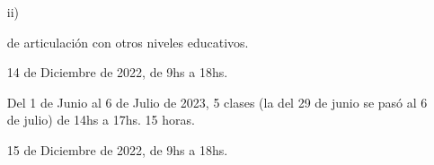 \begin{enumerate}[leftmargin=0.8cm]
{\begin{itemize}[leftmargin=0.2cm]
{\begin{itemize}[leftmargin=0.2cm]
          {}{28, 29 y 30 de Junio de 2016, los tres días durante toda la jornada.}

          {}{16, 17 y 18 de Junio de 2015, los tres días durante toda la jornada.}

          {}{17, 18 y 19 de Junio de 2014, los tres días durante toda la jornada.}

        \end{itemize}

      }

      \item[ii)]{de articulación con otros niveles educativos.

        \begin{itemize}[leftmargin=0.2cm]

          {}{14 de Diciembre de 2022, de 9hs a 18hs.}

          {}{Del 1 de Junio al 6 de Julio de 2023, 5 clases (la del 29 de junio se pasó al 6 de julio) de 14hs a 17hs. 15 horas.}

          {}{15 de Diciembre de 2022, de 9hs a 18hs.}


\end{itemize}}
\end{itemize}}
\end{enumerate}
